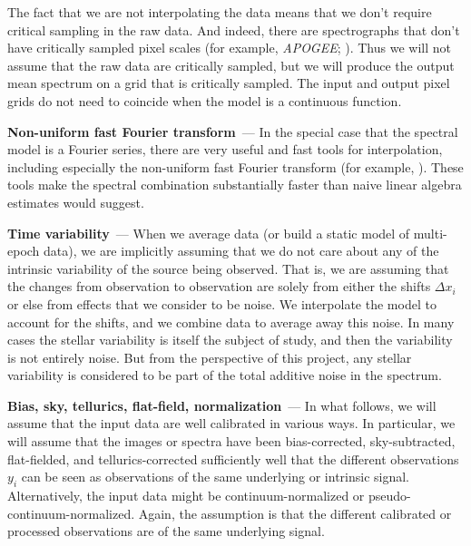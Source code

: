 \documentclass[modern]{aastex631}
\renewcommand{\paragraph}[1]{\medskip\par\noindent\textbf{#1}~---}
\begin{document}
The fact that we are not interpolating the data means that we don't require critical sampling in the raw data.
And indeed, there are spectrographs that don't have critically sampled pixel scales (for example, \textsl{APOGEE}; \citealt{apogee}).
Thus we will not assume that the raw data are critically sampled, but we will produce the output mean spectrum on a grid that is critically sampled.
The input and output pixel grids do not need to coincide when the model is a continuous function.

\paragraph{Non-uniform fast Fourier transform}
In the special case that the spectral model is a Fourier series, there are very useful and fast tools for interpolation, including especially the non-uniform fast Fourier transform (for example, \citealt{finufft}).
These tools make the spectral combination substantially faster than naive linear algebra estimates would suggest.

\paragraph{Time variability}
When we average data (or build a static model of multi-epoch data), we are implicitly assuming that we do not care about any of the intrinsic variability of the source being observed.
That is, we are assuming that the changes from observation to observation are solely from either the shifts $\Delta x_i$ or else from effects that we consider to be noise.
We interpolate the model to account for the shifts, and we combine data to average away this noise.
In many cases the stellar variability is itself the subject of study, and then the variability is not entirely noise.
But from the perspective of this project, any stellar variability is considered to be part of the total additive noise in the spectrum.

\paragraph{Bias, sky, tellurics, flat-field, normalization}
In what follows, we will assume that the input data are well calibrated in various ways.
In particular, we will assume that the images or spectra have been bias-corrected, sky-subtracted, flat-fielded, and tellurics-corrected sufficiently well that the different observations $y_i$ can be seen as observations of the same underlying or intrinsic signal.
Alternatively, the input data might be continuum-normalized or pseudo-continuum-normalized.
Again, the assumption is that the different calibrated or processed observations are of the same underlying signal.
\end{document}
